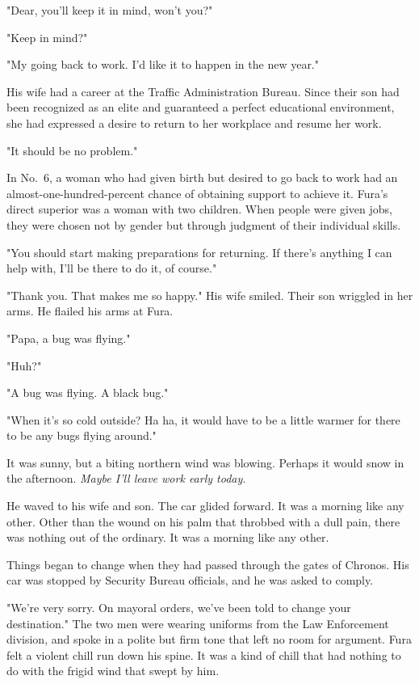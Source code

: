 "Dear, you'll keep it in mind, won't you?"

"Keep in mind?"

"My going back to work. I'd like it to happen in the new year."

His wife had a career at the Traffic Administration Bureau. Since their
son had been recognized as an elite and guaranteed a perfect educational
environment, she had expressed a desire to return to her workplace and
resume her work.

"It should be no problem."

In No.~6, a woman who had given birth but desired to go back to work had
an almost-one-hundred-percent chance of obtaining support to achieve it.
Fura's direct superior was a woman with two children. When people were
given jobs, they were chosen not by gender but through judgment of their
individual skills.

"You should start making preparations for returning. If there's anything
I can help with, I'll be there to do it, of course."

"Thank you. That makes me so happy." His wife smiled. Their son wriggled
in her arms. He flailed his arms at Fura.

"Papa, a bug was flying."

"Huh?"

"A bug was flying. A black bug."

"When it's so cold outside? Ha ha, it would have to be a little warmer
for there to be any bugs flying around."

It was sunny, but a biting northern wind was blowing. Perhaps it would
snow in the afternoon. \emph{Maybe I'll leave work early today.}

He waved to his wife and son. The car glided forward. It was a morning
like any other. Other than the wound on his palm that throbbed with a
dull pain, there was nothing out of the ordinary. It was a morning like
any other.

Things began to change when they had passed through the gates of
Chronos. His car was stopped by Security Bureau officials, and he was
asked to comply.

"We're very sorry. On mayoral orders, we've been told to change your
destination." The two men were wearing uniforms from the Law Enforcement
division, and spoke in a polite but firm tone that left no room for
argument. Fura felt a violent chill run down his spine. It was a kind of
chill that had nothing to do with the frigid wind that swept by him.

